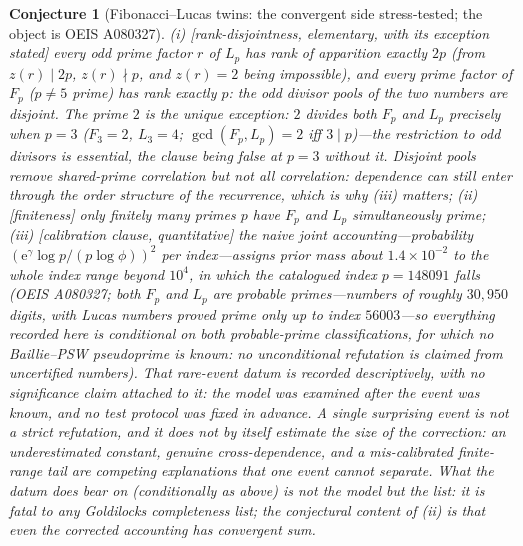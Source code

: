 \documentclass[11pt]{article}
\newtheorem{conjecture}{Conjecture}
\theoremstyle{definition}
\newcommand{\e}{\mathrm{e}}
\begin{document}
\setcounter{conjecture}{19}%
\begin{conjecture}[Fibonacci--Lucas twins: the convergent side
stress-tested; the object is OEIS A080327]\label{c9}
\emph{(i)} [rank-disjointness, elementary, with its exception stated]
every \emph{odd} prime factor $r$ of $L_p$ has rank of apparition
exactly $2p$ (from $z(r)\mid2p$, $z(r)\nmid p$, and $z(r)=2$ being
impossible), and every prime factor of $F_p$ ($p\neq5$ prime) has
rank exactly $p$: the odd divisor pools of the two numbers are
disjoint.  The prime $2$ is the unique exception: $2$ divides both
$F_p$ and $L_p$ precisely when $p=3$
($F_3=2$, $L_3=4$; $\gcd(F_p,L_p)=2$ iff $3\mid p$)---the
restriction to odd divisors is essential, the clause being false at
$p=3$ without it.  Disjoint pools remove shared-\emph{prime}
correlation but not all correlation: dependence can still enter
through the order structure of the recurrence, which is why (iii)
matters;
\emph{(ii)} [finiteness] only finitely many primes $p$ have $F_p$ and
$L_p$ simultaneously prime;
\emph{(iii)} [calibration clause, quantitative] the
naive joint accounting---probability
$(\e^{\gamma}\log p/(p\log\phi))^2$ per index---assigns prior mass about $1.4\times10^{-2}$ to the whole index range beyond $10^4$, in which the catalogued index $p=148091$ falls (OEIS A080327; \emph{both} $F_p$ and $L_p$ are
\emph{probable} primes---numbers of roughly $30{,}950$ digits, with
Lucas numbers proved prime only up to index $56003$---so everything
recorded here is conditional on both probable-prime classifications,
for which no Baillie--PSW pseudoprime is known: no unconditional refutation is claimed from uncertified numbers). That rare-event datum is recorded
descriptively, with no significance claim attached to it: the model
was examined after the event was known, and no test protocol was
fixed in advance.  A single surprising event is
not a strict refutation, and it does not by itself estimate the
\emph{size} of the correction: an underestimated constant, genuine
cross-dependence,
and a mis-calibrated finite-range tail are competing explanations
that one event cannot separate.  What the datum does bear on
(conditionally as above) is not the model but the list: it is fatal
to any Goldilocks completeness list; the conjectural content of (ii)
is that even the corrected accounting has convergent sum.
\end{conjecture}
\end{document}
